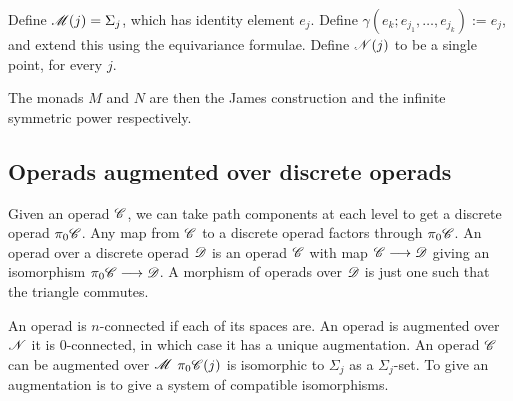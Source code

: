 \documentclass[11pt]{article}
\begin{document}
\begin{chapter1-3}
Define $\mathscr{M}(j)=\Sigma_j$, which has identity element $e_j$. Define
$\gamma(e_k;e_{j_1},\ldots,e_{j_k}):=e_{j}$, and extend this using the
equivariance formulae. Define $\mathscr{N}(j)$ to be a single point, for every $j$.

The monads $M$ and $N$ are then the James construction and the infinite 
symmetric power respectively.
\subsection*{Operads augmented over discrete operads}
Given an operad $\mathscr{C}$, we can take path components at each level to get a
discrete operad $\pi_0\mathscr{C}$. Any map from $\mathscr{C}$ to a discrete operad factors
through $\pi_0\mathscr{C}$. An operad over a discrete operad $\mathscr{D}$ is an operad
$\mathscr{C}$ with map $\mathscr{C}\longrightarrow\mathscr{D}$ giving an isomorphism $\pi_0\mathscr{C}\longrightarrow\mathscr{D}$.
A morphism of operads over $\mathscr{D}$ is just one such that the triangle commutes.

An operad is $n$-connected if each of its spaces are. An operad is augmented over
$\mathscr{N}$ \Iff it is $0$-connected, in which case it has a unique augmentation.
An operad $\mathscr{C}$ can be augmented over $\mathscr{M}$ \Iff $\pi_0\mathscr{C}(j)$ is isomorphic
to $\Sigma_j$ as a $\Sigma_j$-set. To give an augmentation is to give a system
of compatible isomorphisms.


\end{chapter1-3}
\end{document}
